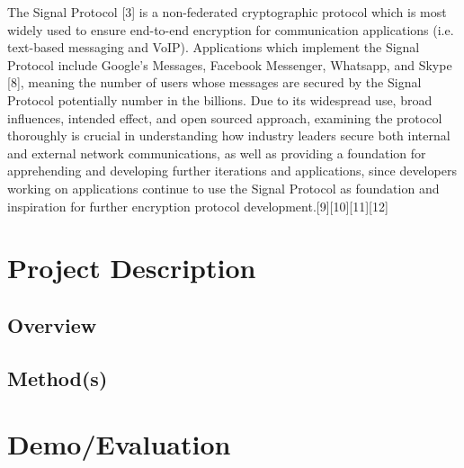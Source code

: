 \documentclass[12pt]{article}
\begin{document}
\par %
The Signal Protocol [3] is a non-federated cryptographic protocol which is most widely used to ensure end-to-end encryption for communication applications (i.e. text-based messaging and VoIP). Applications which implement the Signal Protocol include Google’s Messages, Facebook Messenger, Whatsapp, and Skype [8], meaning the number of users whose messages are secured by the Signal Protocol potentially number in the billions.
Due to its widespread use, broad influences, intended effect, and open sourced approach, examining the protocol thoroughly is crucial in understanding how industry leaders secure both internal and external network communications, as well as providing a foundation for apprehending and developing further iterations and applications, since developers working on applications continue to use the Signal Protocol as foundation and inspiration for further encryption protocol development.[9][10][11][12]

\par%



\newpage
\section{Project Description}

\subsection{Overview}
\par  %

\subsection{Method(s)}
\par %

\newpage
\section{Demo/Evaluation}
\end{document}
